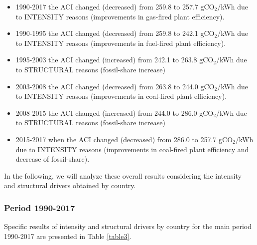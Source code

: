 \documentclass[energies,article,accept,moreauthors,12pt,a4paper]{mdpi} %
\begin{document}
\begin{itemize}
  \item 1990-2017 the ACI changed (decreased) from 259.8 to 257.7 gCO$_2$/kWh due to INTENSITY reasons (improvements in  gas-fired plant efficiency).
  \item 1990-1995 the ACI changed (decreased) from 259.8 to 242.1 gCO$_2$/kWh due to INTENSITY reasons (improvements in  fuel-fired plant efficiency).
  \item 1995-2003 the ACI changed (increased) from 242.1 to 263.8 gCO$_2$/kWh due to STRUCTURAL reasons (fossil-share increase)
  \item 2003-2008 the ACI changed (decreased) from 263.8 to 244.0 gCO$_2$/kWh due to INTENSITY reasons (improvements in  coal-fired plant efficiency).
  \item 2008-2015   the ACI changed (increased) from 244.0 to 286.0 gCO$_2$/kWh due to STRUCTURAL reasons (fossil-share increase)
  \item 2015-2017 when the ACI changed (decreased) from 286.0 to 257.7 gCO$_2$/kWh  due to INTENSITY reasons (improvements in  coal-fired plant efficiency and decrease of fossil-share).
\end{itemize}

In the following, we will analyze these overall results considering the intensity and structural drivers obtained by country.

\newpage



\subsubsection{Period 1990-2017}

 Specific results of intensity and structural  drivers by country for the main period 1990-2017 are presented in Table \ref{table3}.
\end{document}
